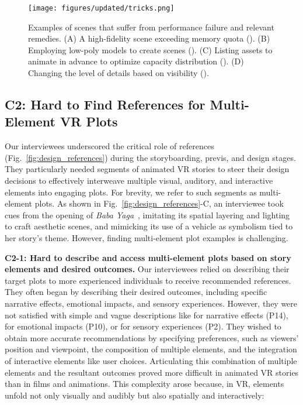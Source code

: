 \begin{figure*}[!tb]
    \centering
    \texttt{[image: figures/updated/tricks.png]}
    \caption{Examples of scenes that suffer from performance failure and relevant remedies. (A) A high-fidelity scene exceeding memory quota (). (B) Employing low-poly models to create scenes (). (C) Listing assets to animate in advance to optimize capacity distribution (). (D) Changing the level of details based on visibility ().} 
    \label{fig:capacity_fidelity}
\end{figure*}

\subsection{C2: Hard to Find References for Multi-Element VR Plots}
\label{sec:reference_plots}

Our interviewees underscored the critical role of references (Fig.~\ref{fig:design_references}) during the storyboarding, previs, and design stages. They particularly needed segments of animated VR stories to steer their design decisions to effectively interweave multiple visual, auditory, and interactive elements into engaging plots. For brevity, we refer to such segments as multi-element plots. 
As shown in Fig.~\ref{fig:design_references}-C, an interviewee took cues from the opening of \textit{Baba Yaga}~\cite{Babayaga}, imitating its spatial layering and lighting to craft aesthetic scenes, and mimicking its use of a vehicle as symbolism tied to her story's theme. However, finding multi-element plot examples is challenging.

\textbf{C2-1: Hard to describe and access multi-element plots based on story elements and desired outcomes.}
Our interviewees relied on describing their target plots to more experienced individuals to receive recommended references. They often began by describing their desired outcomes, including specific narrative effects, emotional impacts, and sensory experiences. However, they were not satisfied with simple and vague descriptions like  for narrative effects (P14),  for emotional impacts (P10), or  for sensory experiences (P2). They wished to obtain more accurate recommendations by specifying preferences, such as viewers' position and viewpoint, the composition of multiple elements, and the integration of interactive elements like user choices. Articulating this combination of multiple elements and the resultant outcomes proved more difficult in animated VR stories than in films and animations. This complexity arose because, in VR, elements unfold not only visually and audibly but also spatially and interactively:

